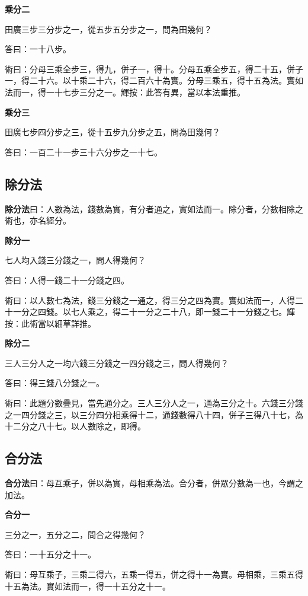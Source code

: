 \documentclass[11pt,a4paper]{article}
\newenvironment{problemenv}[1]{%
  \medskip\noindent\textbf{#1}\par\nopagebreak\smallskip
}{\medskip}
\begin{document}
\begin{problemenv}{乘分二}
田廣三步三分步之一，從五步五分步之一，問為田幾何？

\textsf{答曰：}一十八步。

\textsf{術曰：}分母三乘全步三，得九，併子一，得十。分母五乘全步五，得二十五，併子一，得二十六。以十乘二十六，得二百六十為實。分母三乘五，得十五為法。實如法而一，得一十七步三分之一。輝按：此答有異，當以本法重推。
\end{problemenv}

\begin{problemenv}{乘分三}
田廣七步四分步之三，從十五步九分步之五，問為田幾何？

\textsf{答曰：}一百二十一步三十六分步之一十七。
\end{problemenv}

\subsection{除分法}

\textbf{除分法}曰：人數為法，錢數為實，有分者通之，實如法而一。除分者，分數相除之術也，亦名經分。

\begin{problemenv}{除分一}
七人均入錢三分錢之一，問人得幾何？

\textsf{答曰：}人得一錢二十一分錢之四。

\textsf{術曰：}以人數七為法，錢三分錢之一通之，得三分之四為實。實如法而一，人得二十一分之四錢。以七人乘之，得二十一分之二十八，即一錢二十一分錢之七。輝按：此術當以細草詳推。
\end{problemenv}

\begin{problemenv}{除分二}
三人三分人之一均六錢三分錢之一四分錢之三，問人得幾何？

\textsf{答曰：}得三錢八分錢之一。

\textsf{術曰：}此題分數疊見，當先通分之。三人三分人之一，通為三分之十。六錢三分錢之一四分錢之三，以三分四分相乘得十二，通錢數得八十四，併子三得八十七，為十二分之八十七。以人數除之，即得。
\end{problemenv}

\subsection{合分法}

\textbf{合分法}曰：母互乘子，併以為實，母相乘為法。合分者，併眾分數為一也，今謂之加法。

\begin{problemenv}{合分一}
三分之一，五分之二，問合之得幾何？

\textsf{答曰：}一十五分之十一。

\textsf{術曰：}母互乘子，三乘二得六，五乘一得五，併之得十一為實。母相乘，三乘五得十五為法。實如法而一，得一十五分之十一。
\end{problemenv}
\end{document}
